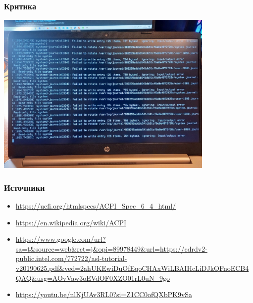 \documentclass{beamer}
\begin{document}

\begin{frame}
	\frametitle{Критика}
	\hspace{18pt}
	\includegraphics[width=300pt]{pictures/trouble1.jpg}
\end{frame}

\begin{frame}
	\frametitle{Источники}
	\begin{itemize}
		\item \href{https://uefi.org/htmlspecs/ACPI\_Spec\_6\_4\_html/}{https://uefi.org/htmlspecs/ACPI\_Spec\_6\_4\_html/}
		\item \href{https://en.wikipedia.org/wiki/ACPI}{https://en.wikipedia.org/wiki/ACPI}
		\item \href{https://www.google.com/url?sa=t\&source=web\&rct=j\&opi=89978449\&url=https://cdrdv2-public.intel.com/772722/asl-tutorial-v20190625.pdf\&ved=2ahUKEwiDuOfEqoCHAxWiLBAIHcLiDJkQFnoECB4QAQ\&usg=AOvVaw3oEVdOF0XZO01rL0uN\_9go}{https://www.google.com/url?sa=t\&source=web\&rct=j\&opi=89978449\&url=https://cdrdv2-public.intel.com/772722/asl-tutorial-v20190625.pdf\&ved=2ahUKEwiDuOfEqoCHAxWiLBAIHcLiDJkQFnoECB4QAQ\&usg=AOvVaw3oEVdOF0XZO01rL0uN\_9go}
		\item \href{https://youtu.be/nlKjUAv3RL0?si=Z1CC0ofQXbPK9vSa}{https://youtu.be/nlKjUAv3RL0?si=Z1CC0ofQXbPK9vSa}
	\end{itemize}
\end{frame}
\end{document}
